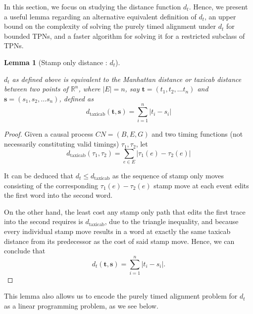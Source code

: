 \documentclass[conference]{IEEEtran}
\newtheorem{lemma}[theorem]{Lemma}
\begin{document}
	In this section, we focus on studying the distance function $d_t$. Hence, we present a useful lemma regarding an alternative equivalent definition of $d_t$, an upper bound on the complexity of solving the purely timed alignment under $d_t$ for bounded TPNs, and a faster algorithm for solving it for a restricted subclass of TPNs. 
	\begin{lemma}[Stamp only distance : $d_t$]\label{manhattan}
		
		
		$d_t$ as defined above is equivalent to the \textit{Manhattan distance} or \textit{taxicab distance} between two points of $\mathbb{R}^n$, where $|E| = n$, say $\mathbf{t} = (t_1, t_2, \dots t_n) $ and $\mathbf{s} = (s_1, s_2, \dots s_n)$, defined as $$d_{\textrm{taxicab}}(\mathbf{t}, \mathbf{s}) = \sum_{i = 1}^{n} |t_i - s_i|$$
	\end{lemma}
		\begin{proof}
		Given a causal process $CN = (B, E, G)$ and two timing functions (not necessarily constituting valid timings) $\tau_1, \tau_2$, let $$d_{\textrm{taxicab}}(\tau_1, \tau_2) = \sum_{e \in E} |\tau_1(e) - \tau_2(e)|$$
		
		It can be deduced that $d_t \leq d_{\textrm{taxicab}}$ as the sequence of stamp only moves consisting of the corresponding $\tau_1(e) - \tau_2(e)$ stamp move at each event edits the first word into the second word. 
		
		On the other hand, the least cost any stamp only path that edits the first trace into the second requires is $d_{\textrm{taxicab}}$, due to the triangle inequality, and because every individual stamp move results in a word at exactly the same taxicab distance from its predecessor as the cost of said stamp move. 
		Hence, we can conclude that $$d_t(\mathbf{t}, \mathbf{s}) = \sum_{i = 1}^{n} |t_i - s_i|.$$
	\end{proof}

	
	
	This lemma also allows us to encode the purely timed alignment problem for $d_t$ as a linear programming problem, as we see below. 
	
\end{document}
